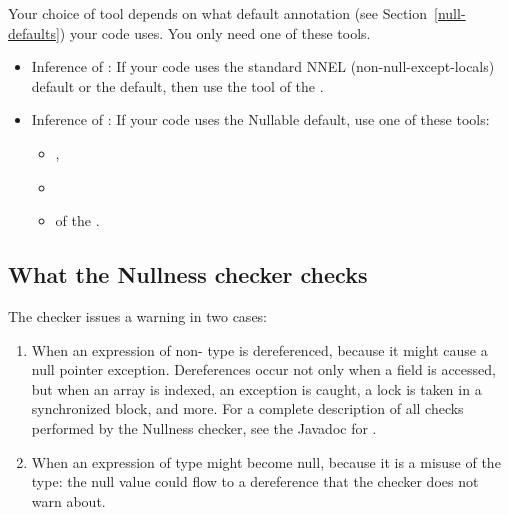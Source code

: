 Your choice of tool depends on what default annotation (see
Section~\ref{null-defaults}) your code uses.  You only need one of these tools.

\begin{itemize}

\item
  Inference of :
  If your code uses the standard NNEL (non-null-except-locals) default or
  the  default, then use the
  tool of the .

\item
  Inference of :
  If your code uses the Nullable default, use one of these tools:
\begin{itemize}
\item
  , 
\item
\item
   of the .
\end{itemize}

\end{itemize}



\subsection{What the Nullness checker checks\label{nullness-checks}}

The checker issues a warning in two cases:

\begin{enumerate}

\item
  When an expression of non- type
  is dereferenced, because it might cause a null pointer exception.
  Dereferences occur not only when a field is accessed, but when an array
  is indexed, an exception is caught, a lock is taken in a synchronized
  block, and more.  For a complete description of all checks performed by
  the Nullness checker, see the Javadoc for
  .

\item
  When an expression of  type might become null, because it
  is a misuse of the type:  the null value could flow to a dereference that
  the checker does not warn about.

\end{enumerate}

